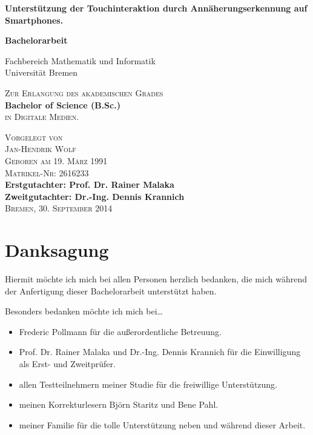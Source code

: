 \documentclass[12pt,numbers=noenddot,parskip,bibliography=totocnumbered,listof=totocnumbered]{scrreprt}
\begin{document}
\begin{titlepage}
\begin{center}
\null
\vfill
\LARGE\textsf{\textbf{Unterstützung der Touchinteraktion durch Annäherungserkennung auf Smartphones.}}

\vfill
\LARGE\textrm{\textbf{Bachelorarbeit}}

\large\textrm{Fachbereich Mathematik und Informatik\\
\vspace{.5em}
Universität Bremen}

\vfill
\large\textsc{Zur Erlangung des akademischen Grades}\\
\vspace{.75em}
\textbf{Bachelor of Science (B.Sc.)}\\
\vspace{.75em}
\textsc{in Digitale Medien.}

\vfill\small\textsc{
Vorgelegt von\\
Jan-Hendrik Wolf\\
Geboren am 19. März 1991\\
Matrikel-Nr: 2616233}\\
\vspace{1cm}
\small\textbf{Erstgutachter:  Prof. Dr. Rainer Malaka\\
Zweitgutachter: Dr.-Ing. Dennis Krannich}\\
\vspace{1cm}
\small\textsc{Bremen, 30. September 2014}
\end{center}
\end{titlepage}

\chapter*{Danksagung}
Hiermit möchte ich mich bei allen Personen herzlich bedanken, die mich während der Anfertigung dieser Bachelorarbeit unterstützt haben.

Besonders bedanken möchte ich mich bei\dots
\begin{itemize}
\item Frederic Pollmann für die außerordentliche Betreuung.
\item Prof. Dr. Rainer Malaka und Dr.-Ing. Dennis Krannich für die Einwilligung als Erst- und Zweitprüfer.
\item allen Testteilnehmern meiner Studie für die freiwillige Unterstützung.
\item meinen Korrekturlesern Björn Staritz und Bene Pahl.
\item meiner Familie für die tolle Unterstützung neben und während dieser Arbeit.
\end{itemize}
\end{document}
